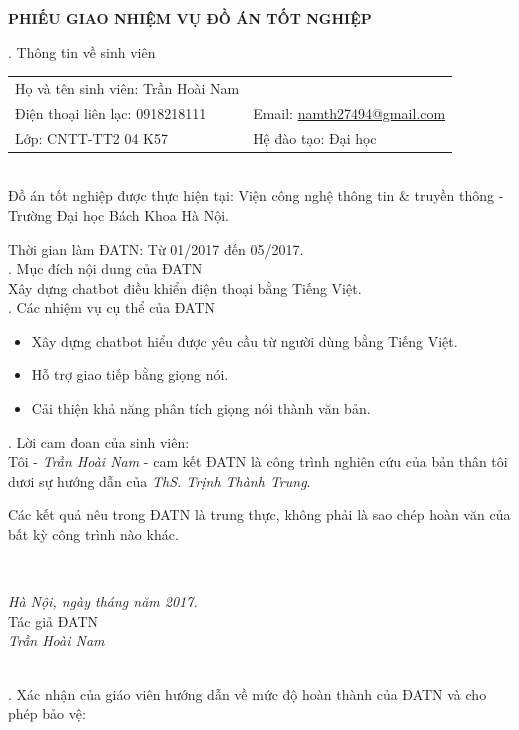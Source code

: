 \documentclass[12pt]{report}
\newcommand{\thesistitle}{Xây dựng chatbot điều khiển điện thoại bằng Tiếng Việt}
\begin{document}
\setcounter{page}{1}

\begin{center}
{\large \textbf{PHIẾU GIAO NHIỆM VỤ ĐỒ ÁN TỐT NGHIỆP}}
\end{center}

. Thông tin về sinh viên\\[0.2cm]
\noindent \begin{tabular}{p{} p{}}
Họ và tên sinh viên: Trần Hoài Nam &   \\ 
Điện thoại liên lạc: 0918218111 & Email: \url{namth27494@gmail.com} \\ 
Lớp: CNTT-TT2 04 K57 & Hệ đào tạo: Đại học \\ 
\end{tabular}\\[0.3cm]
\noindent Đồ án tốt nghiệp được thực hiện tại: Viện công nghệ thông tin \& truyền thông - Trường Đại học Bách Khoa Hà Nội.

\noindent Thời gian làm ĐATN: Từ 01/2017 đến 05/2017.\\[0.4cm]
. Mục đích nội dung của ĐATN\\
\noindent \thesistitle{}.\\[0.4cm]
. Các nhiệm vụ cụ thể của ĐATN
\begin{itemize}
	\item Xây dựng chatbot hiểu được yêu cầu từ người dùng bằng Tiếng Việt.
	\item Hỗ trợ giao tiếp bằng giọng nói.
	\item Cải thiện khả năng phân tích giọng nói thành văn bản.
\end{itemize}

. Lời cam đoan của sinh viên:\\
Tôi - \textit{Trần Hoài Nam} - cam kết ĐATN là công trình nghiên cứu của bản thân tôi dươi sự hướng dẫn của \textit{ThS. Trịnh Thành Trung}.

\noindent Các kết quả nêu trong ĐATN là trung thực, không phải là sao chép hoàn văn của bất kỳ công trình nào khác.\\[0.5cm]
  
\begin{minipage}{0.3\textwidth}
\hspace{1cm}
\end{minipage}
~
\begin{minipage}{0.6\textwidth}
\centering
\textit{Hà Nội, ngày \hspace{0.3cm} tháng  \hspace{0.3cm} năm 2017.} \\
Tác giả ĐATN \\[2cm]
\textit{Trần Hoài Nam}
\end{minipage}\\[0.5cm]
. Xác nhận của giáo viên hướng dẫn về mức độ hoàn thành của ĐATN và cho phép bảo vệ:
  
\end{document}
